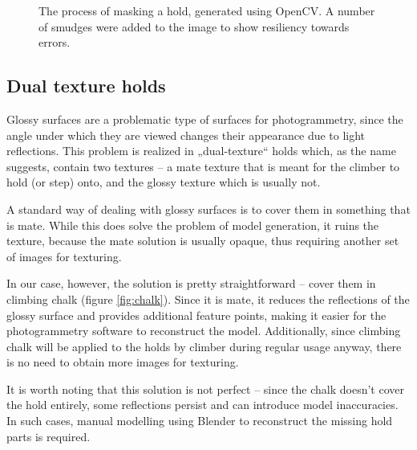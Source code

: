 \begin{figure}
	\centering
	\hfill
	\hfill
	\hfill
	\hfill
	\caption{The process of masking a hold, generated using OpenCV. A number of smudges were added to the image to show resiliency towards errors.}%
	\label{fig:mask}
\end{figure}

\subsection{Dual texture holds}\label{sec:dual}
Glossy surfaces are a problematic type of surfaces for photogrammetry, since the angle under which they are viewed changes their appearance due to light reflections.
This problem is realized in „dual-texture“ holds which, as the name suggests, contain two textures -- a mate texture that is meant for the climber to hold (or step) onto, and the glossy texture which is usually not.

A standard way of dealing with glossy surfaces is to cover them in something that is mate.
While this does solve the problem of model generation, it ruins the texture, because the mate solution is usually opaque, thus requiring another set of images for texturing.

In our case, however, the solution is pretty straightforward -- cover them in climbing chalk (figure \ref{fig:chalk}).
Since it is mate, it reduces the reflections of the glossy surface and provides additional feature points, making it easier for the photogrammetry software to reconstruct the model.
Additionally, since climbing chalk will be applied to the holds by climber during regular usage anyway, there is no need to obtain more images for texturing.

It is worth noting that this solution is not perfect -- since the chalk doesn't cover the hold entirely, some reflections persist and can introduce model inaccuracies.
In such cases, manual modelling using Blender to reconstruct the missing hold parts is required.

